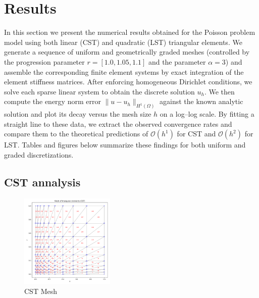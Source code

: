 \section{Results}

In this section we present the numerical results obtained for the Poisson problem model using both linear (CST) and quadratic (LST) triangular elements. We generate a sequence of uniform and geometrically graded meshes (controlled by the progression parameter $r = [1.0, 1.05, 1.1]$ and the parameter $\alpha = 3$) and assemble the corresponding finite element systems by exact integration of the element stiffness matrices. After enforcing homogeneous Dirichlet conditions, we solve each sparse linear system to obtain the discrete solution \(u_h\). We then compute the energy norm error \(\|u - u_h\|_{H^1(\Omega)}\) against the known analytic solution and plot its decay versus the mesh size \(h\) on a log–log scale. By fitting a straight line to these data, we extract the observed convergence rates and compare them to the theoretical predictions of \(\mathcal{O}(h^1)\) for CST and \(\mathcal{O}(h^2)\) for LST. Tables and figures below summarize these findings for both uniform and graded discretizations.  

\subsection{CST annalysis}

\begin{figure}[H]
\centering
\includegraphics[width=0.4\textwidth]{GRAFICOS/CST/CST_mesh_plot.png}
\caption{CST Mesh}
\label{fig:cst_results}
\end{figure}

